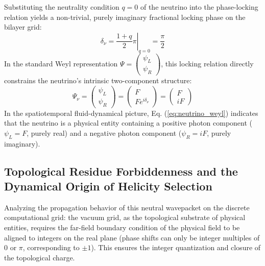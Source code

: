 \documentclass[12pt, a4paper]{article}
\begin{document}
Substituting the neutrality condition $q=0$ of the neutrino into the phase-locking relation yields a non-trivial, purely imaginary fractional locking phase on the bilayer grid:
\begin{equation}
\left. \delta_\nu = \frac{1+q}{2}\pi \right|_{q=0} = \frac{\pi}{2} \label{eq:neutrino_lock_phase}
\end{equation}
In the standard Weyl representation $\Psi = \begin{pmatrix} \psi_L \\ \psi_R \end{pmatrix}$, this locking relation directly constrains the neutrino's intrinsic two-component structure:
\begin{equation}
\Psi_\nu = \begin{pmatrix} \psi_L \\ \psi_R \end{pmatrix} = \begin{pmatrix} F \\ F e^{i\delta_\nu} \end{pmatrix} = \begin{pmatrix} F \\ iF \end{pmatrix} \label{eq:neutrino_weyl}
\end{equation}
In the spatiotemporal fluid-dynamical picture, Eq. (\ref{eq:neutrino_weyl}) indicates that the neutrino is a physical entity containing a positive photon component ($\psi_L = F$, purely real) and a negative photon component ($\psi_R = iF$, purely imaginary).

\subsection{Topological Residue Forbiddenness and the Dynamical Origin of Helicity Selection}

Analyzing the propagation behavior of this neutral wavepacket on the discrete computational grid: the vacuum grid, as the topological substrate of physical entities, requires the far-field boundary condition of the physical field to be aligned to integers on the real plane (phase shifts can only be integer multiples of $0$ or $\pi$, corresponding to $\pm 1$). This ensures the integer quantization and closure of the topological charge.
\end{document}
